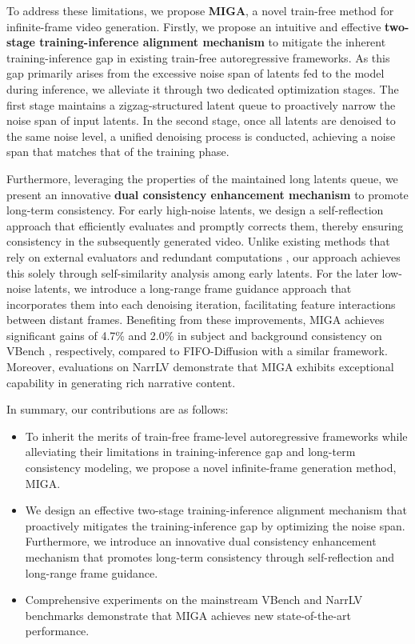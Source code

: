 \documentclass{llmxive}
\begin{document}
To address these limitations, we propose \textbf{MIGA}, a novel train-free method for infinite-frame video generation. Firstly, we propose an intuitive and effective \textbf{two-stage training-inference alignment mechanism} to mitigate the inherent training-inference gap in existing train-free autoregressive frameworks. 
As this gap primarily arises from the excessive noise span of latents fed to the model during inference, we alleviate it through two dedicated optimization stages.
The first stage maintains a zigzag-structured latent queue to proactively narrow the noise span of input latents. 
In the second stage, once all latents are denoised to the same noise level, a unified denoising process is conducted, achieving a noise span that matches that of the training phase.

Furthermore, leveraging the properties of the maintained long latents queue, we present an innovative \textbf{dual consistency enhancement mechanism} to promote long-term consistency. 
For early high-noise latents, we design a self-reflection approach that efficiently evaluates and promptly corrects them, thereby ensuring consistency in the subsequently generated video.
Unlike existing methods that rely on external evaluators and redundant computations \cite{yang2025scalingnoise,he2025scaling}, our approach achieves this solely through self-similarity analysis among early latents. For the later low-noise latents, we introduce a long-range frame guidance approach that incorporates them into each denoising iteration, facilitating feature interactions between distant frames.
Benefiting from these improvements, MIGA achieves significant gains of 4.7\% and 2.0\% in subject and background consistency on VBench \cite{huang2024vbench}, respectively, compared to FIFO-Diffusion with a similar framework. Moreover, evaluations on NarrLV \cite{feng2025narrlv} demonstrate that MIGA exhibits exceptional capability in generating rich narrative content.


In summary, our contributions are as follows:
\begin{itemize}
    \item To inherit the merits of train-free frame-level autoregressive frameworks while alleviating their limitations in training-inference gap and long-term consistency modeling, we propose a novel infinite-frame generation method, MIGA.
    \item We design an effective two-stage training-inference alignment mechanism that proactively mitigates the training-inference gap by optimizing the noise span. Furthermore, we introduce an innovative dual consistency enhancement mechanism that promotes long-term consistency through self-reflection and long-range frame guidance.
    \item  Comprehensive experiments on the mainstream VBench and NarrLV benchmarks demonstrate that MIGA achieves new state-of-the-art performance.
\end{itemize}
\end{document}
